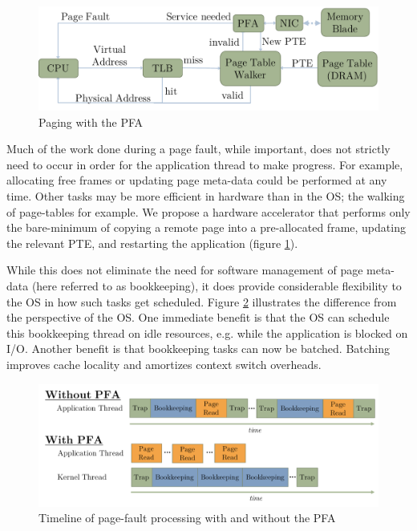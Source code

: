 \begin{figure}[h]
    \centering
    \includegraphics[width=0.9\columnwidth]{figs/generic_pfa.pdf}
    \vspace{-5mm}
    \caption{Paging with the PFA}
    \label{fig:pfa_generic}
\end{figure}

Much of the work done during a page fault, while important, does not strictly
need to occur in order for the application thread to make progress. For
example, allocating free frames or updating page meta-data could be performed at
any time. Other tasks may be more efficient in hardware than in the OS; the
walking of page-tables for example. We propose a hardware accelerator that
performs only the bare-minimum of copying a remote page into a pre-allocated
frame, updating the relevant PTE, and restarting the application (figure
\ref{fig:pfa_generic}).

While this does not eliminate the need for software management of page meta-data
(here referred to as \gls{bookkeeping}), it does provide considerable flexibility
to the OS in how such \glspl{task} get scheduled. Figure
\ref{fig:bookkeeping_timeline} illustrates the difference from the perspective
of the OS. One immediate benefit is that the OS can schedule this bookkeeping
thread on idle resources, e.g. while the application is blocked on I/O.
Another benefit is that bookkeeping tasks can now be batched. Batching improves
cache locality and amortizes context switch overheads. 

\begin{figure}[h]
    \centering
    \includegraphics[width=\columnwidth]{figs/bookkeeping_timeline.pdf}
    \vspace{-5mm}
    \caption{Timeline of page-fault processing with and without the PFA}
    \label{fig:bookkeeping_timeline}
\end{figure}

